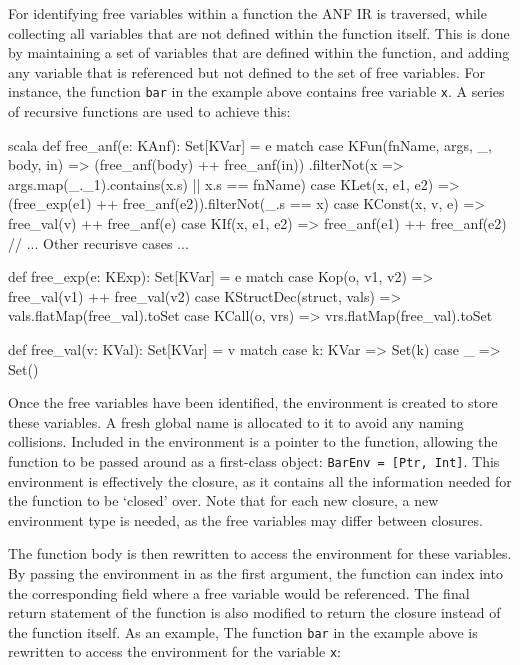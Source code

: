 For identifying free variables within a function the ANF IR is traversed, while collecting all
variables that are not defined within the function itself. This is done by maintaining a set of
variables that are defined within the function, and adding any variable that is referenced but not
defined to the set of free variables. For instance, the function \texttt{bar} in the example above
contains free variable \texttt{x}. A series of recursive functions are used to achieve this:

\begin{code}{scala}
    def free_anf(e: KAnf): Set[KVar] = e match {
        case KFun(fnName, args, _, body, in) =>
            (free_anf(body) ++ free_anf(in))
                .filterNot(x => args.map(_._1).contains(x.s) || x.s == fnName)
        case KLet(x, e1, e2) => (free_exp(e1) ++ free_anf(e2)).filterNot(_.s == x)
        case KConst(x, v, e) => free_val(v) ++ free_anf(e)
        case KIf(x, e1, e2) => free_anf(e1) ++ free_anf(e2)
        // ... Other recurisve cases ...
    }

    def free_exp(e: KExp): Set[KVar] = e match {
        case Kop(o, v1, v2) => free_val(v1) ++ free_val(v2)
        case KStructDec(struct, vals) => vals.flatMap(free_val).toSet
        case KCall(o, vrs) => vrs.flatMap(free_val).toSet
    }

    def free_val(v: KVal): Set[KVar] = v match {
        case k: KVar => Set(k)
        case _ => Set()
    }
\end{code}

Once the free variables have been identified, the environment is created to store these
variables. A fresh global name is allocated to it to avoid any naming collisions.
Included in the environment is a pointer to the function, allowing the function to be passed around
as a first-class object:
\texttt{BarEnv = [Ptr, Int]}.
This environment is effectively the closure, as it contains all the information needed for the
function to be `closed' over. Note that for each new closure, a new environment type is needed, as
the free variables may differ between closures.

The function body is then rewritten to access the environment for these variables. By passing the
environment in as the first argument, the function can index into the corresponding field where a
free variable would be referenced. The final return statement of the function is also modified to
return the closure instead of the function itself. As an example, The function \texttt{bar} in the
example above is rewritten to access the environment for the variable \texttt{x}:

